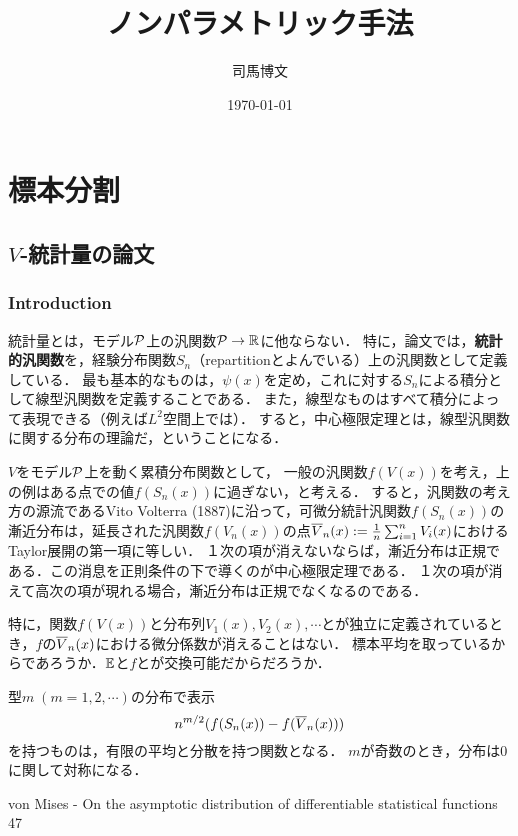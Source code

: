 \documentclass[uplatex,dvipdfmx]{jsreport}
\title{ノンパラメトリック手法}
\author{司馬博文}
\date{\today}
\begin{document}
\tableofcontents

\chapter{標本分割}

\section{$V$-統計量の論文}

\subsection{Introduction}

\begin{definition}
    統計量とは，モデル$\P$上の汎関数$\P\to\R$に他ならない．
    特に，論文\cite{von Mises}では，\textbf{統計的汎関数}を，経験分布関数$S_n$（repartitionとよんでいる）上の汎関数として定義している．
    最も基本的なものは，$\psi(x)$を定め，これに対する$S_n$による積分として線型汎関数を定義することである．
    また，線型なものはすべて積分によって表現できる（例えば$L^2$空間上では）．
    すると，中心極限定理とは，線型汎関数に関する分布の理論だ，ということになる．
\end{definition}

\begin{discussion}[動機]
    $V$をモデル$\P$上を動く累積分布関数として，
    一般の汎関数$f(V(x))$を考え，上の例はある点での値$f(S_n(x))$に過ぎない，と考える．
    すると，汎関数の考え方の源流であるVito Volterra (1887)に沿って，可微分統計汎関数$f(S_n(x))$の漸近分布は，延長された汎関数$f(V_n(x))$の点$\o{V}_n(x):=\frac{1}{n}\sum_{i=1}^nV_i(x)$におけるTaylor展開の第一項に等しい．
    １次の項が消えないならば，漸近分布は正規である．この消息を正則条件の下で導くのが中心極限定理である．
    １次の項が消えて高次の項が現れる場合，漸近分布は正規でなくなるのである．

    特に，関数$f(V(x))$と分布列$V_1(x),V_2(x),\cdots$とが独立に定義されているとき，$f$の$\o{V}_n(x)$における微分係数が消えることはない．
    標本平均を取っているからであろうか．$\bE$と$f$とが交換可能だからだろうか．
\end{discussion}

\begin{discussion}
    型$m\;(m=1,2,\cdots)$の分布で表示
    \[n^{m/2}(f(S_n(x))-f(\o{V}_n(x)))\]
    を持つものは，有限の平均と分散を持つ関数となる．
    $m$が奇数のとき，分布は$0$に関して対称になる．
\end{discussion}

\begin{thebibliography}{9}
    von Mises - On the asymptotic distribution of differentiable statistical functions 47
\end{thebibliography}
\end{document}
